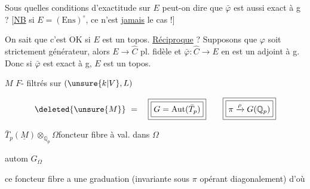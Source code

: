 Sous quelles conditions d'exactitude sur $E$ peut-on dire que $\bar\varphi$ est aussi exact à g ? [\uline{NB} si $E=(\mathrm{Ens})^\circ$, ce n'est \uline{jamais} le cas !]

On sait que c'est OK si $E$ est un topos. \uline{Réciproque} ? Supposons que $\varphi$ soit strictement générateur,  alors $E\to\hat C$ pl.  fidèle et $\bar\varphi:\hat C\to E$ en est un adjoint à g. Donc si $\bar\varphi$ est exact à g, $E$ est un topos.





$M$  $F$- filtrés sur $(\unsure{k|V},L)$

\[\deleted{\unsure{M}}\ =\quad\boxed{\boxed{G=\operatorname{Aut}(\bar T_p)}}\qquad\boxed{\boxed{\pi\xrightarrow{\rho}G(\mathbb Q_p)}}\]

\quad $\bar T_p(\underline M)\otimes_{\mathbb Q_p}\Omega$\quad foncteur fibre à val. dans $\Omega$

 autom \quad $G_\Omega$

ce foncteur fibre a une graduation (invariante sous $\pi$ opérant diagonalement) d'où

